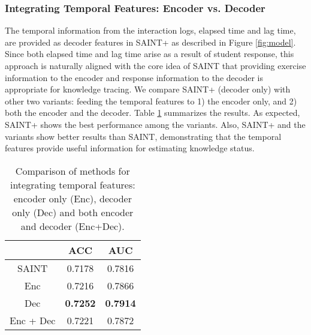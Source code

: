 \subsubsection{Integrating Temporal Features: Encoder vs. Decoder}
The temporal information from the interaction logs, elapsed time and lag time, are provided as decoder features in SAINT+ as described in Figure \ref{fig:model}.
Since both elapsed time and lag time arise as a result of student response, this approach is naturally aligned with the core idea of SAINT that providing exercise information to the encoder and response information to the decoder is appropriate for knowledge tracing.
We compare SAINT+ (decoder only) with other two variants: feeding the temporal features to 1) the encoder only, and 2) both the encoder and the decoder.
Table \ref{tab:encdec} summarizes the results.
As expected, SAINT+ shows the best performance among the variants.
Also, SAINT+ and the variants show better results than SAINT, demonstrating that the temporal features provide useful information for estimating knowledge status.

\begin{table}[ht]
\caption{Comparison of methods for integrating temporal features: encoder only (Enc), decoder only (Dec) and both encoder and decoder (Enc+Dec).}
\centering
\normalsize
\begin{tabular}{ccc}
\toprule
 & ACC & AUC \\ 
\midrule
SAINT & 0.7178 & 0.7816 \\
Enc & 0.7216 & 0.7866 \\
Dec & \textbf{0.7252} & \textbf{0.7914} \\
Enc + Dec & 0.7221 & 0.7872 \\
\bottomrule
\end{tabular}
\label{tab:encdec}
\end{table}
